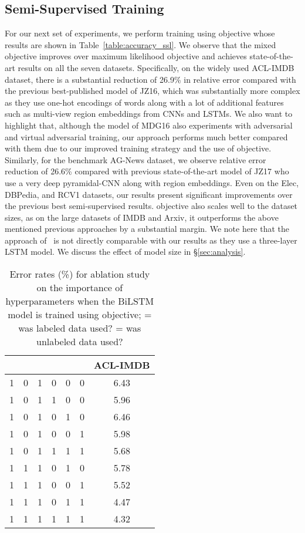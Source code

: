 \documentclass[letterpaper]{article}
\newcommand{\citet}[1]{\citeauthor{#1} \shortcite{#1}}
\begin{document}
\subsection{Semi-Supervised Training}
For our next set of experiments, we perform training using  objective whose results are shown in Table~\ref{table:accuracy_ssl}. We observe that the mixed objective improves over maximum likelihood objective and achieves state-of-the-art results on all the seven datasets. Specifically, on the widely used ACL-IMDB dataset, there is a substantial reduction of 26.9\% in relative error compared with the previous best-published model of JZ16, which was substantially more complex as they use one-hot encodings of words along with a lot of additional features such as multi-view region embeddings from CNNs and LSTMs. We also want to highlight that, although the model of MDG16 also experiments with adversarial and virtual adversarial training, our approach performs much better compared with them due to our improved training strategy and the use of  objective. Similarly, for the benchmark AG-News dataset, we observe relative error reduction of 26.6\% compared with previous state-of-the-art model of JZ17 who use a very deep pyramidal-CNN along with region embeddings. Even on the Elec, DBPedia, and RCV1 datasets, our results present significant improvements over the previous best semi-supervised results.  objective also scales well to the dataset sizes, as on the large datasets of IMDB and Arxiv, it outperforms the above mentioned previous approaches by a substantial margin. We note here that the approach of~\citet{howard2018universal} is not directly comparable with our results as they use a three-layer LSTM model. We discuss the effect of model size in \S\ref{sec:analysis}.

\begin{table}[t]
\small
\centering
\begin{tabular}{@{} c c c c c c | c @{}} 
\toprule
 &  &  &  &  &  & ACL-IMDB \\
\midrule
1 & 0 & 1 & 0 & 0 & 0 & 6.43 \\
1 & 0 & 1 & 1 & 0 & 0 & 5.96 \\
1 & 0 & 1 & 0 & 1 & 0 & 6.46 \\
1 & 0 & 1 & 0 & 0 & 1 & 5.98 \\
1 & 0 & 1 & 1 & 1 & 1 & 5.68 \\
\midrule
1 & 1 & 1 & 0 & 1 & 0 & 5.78 \\
1 & 1 & 1 & 0 & 0 & 1 & 5.52 \\
1 & 1 & 1 & 0 & 1 & 1 & 4.47 \\
1 & 1 & 1 & 1 & 1 & 1 & 4.32 \\
\bottomrule
\end{tabular}
\caption{Error rates (\%) for ablation study on the importance of hyperparameters when the BiLSTM model is trained using  objective;  = was labeled data used?  = was unlabeled data used?}
\label{table:ablation_unsup}
\end{table}
\end{document}
